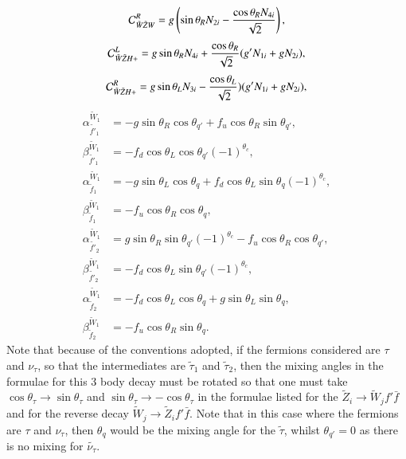 \documentclass[final,3p,times]{elsarticle}
\begin{document}
\begin{equation}
\mathcal{C}_{\tilde{W} \tilde{Z} W}^R = g\left(\sin\theta_R N_{2i} - {\cos\theta_R N_{4i} \over \sqrt{2}}\right),
\end{equation}
\begin{equation}
\mathcal{C}_{\tilde{W} \tilde{Z} H+}^L = g\sin\theta_R N_{4i} + {\cos\theta_R \over \sqrt{2}}(g' N_{1i} + g N_{2i}),
\end{equation}
\begin{equation}
\mathcal{C}_{\tilde{W} \tilde{Z} H+}^R = g\sin\theta_L N_{3i} - {\cos\theta_L \over \sqrt{2}})(g' N_{1i} + g N_{2i}),
\end{equation}
\begin{align}
\alpha_{\tilde{f'}_1}^{\tilde{W}_1} &= -g \sin\theta_R \cos\theta_{q'} + f_{u}\cos\theta_{R}\sin\theta_{q'}, \\
\beta_{\tilde{f'}_1}^{\tilde{W}_1} &= -f_{d}\cos\theta_L \cos\theta_{q'} (-1)^{\theta_c}, \\
\alpha_{\tilde{f}_1}^{\tilde{W}_1} &= -g\sin\theta_L \cos\theta_q + f_{d}\cos\theta_L \sin\theta_q(-1)^{\theta_c}, \\
\beta_{\tilde{f}_1}^{\tilde{W}_1} &= -f_{u}\cos\theta_R \cos\theta_q, \\
\alpha_{\tilde{f'}_2}^{\tilde{W}_1} &= g\sin\theta_R \sin\theta_{q'}(-1)^{\theta_c} - f_{u}\cos\theta_R \cos\theta_{q'}, \\
\beta_{\tilde{f'}_2}^{\tilde{W}_1} &= -f_{d}\cos\theta_L \sin\theta_{q'}(-1)^{\theta_c}, \\
\alpha_{\tilde{f}_2}^{\tilde{W}_1} &= -f_{d}\cos\theta_{L}\cos\theta_{q} + g\sin\theta_{L}\sin\theta_{q}, \\
\beta_{\tilde{f}_2}^{\tilde{W}_1} &= -f_{u}\cos\theta_R\sin\theta_{q}.
\end{align}
Note that because of the conventions adopted, if the fermions considered are $\tau$ and $\nu_{\tau}$, so that the intermediates are $\tilde{\tau}_1$ and $\tilde{\tau}_2$, then the mixing angles in the formulae for this 3 body	 decay must be rotated so that one must take $\cos\theta_{\tau} \rightarrow \sin\theta_{\tau}$ and $\sin\theta_{\tau} \rightarrow -\cos\theta_{\tau}$ in the formulae listed for the $\tilde{Z}_i \rightarrow \tilde{W}_j  f' \bar{f}$ and for the reverse decay $\tilde{W}_j \rightarrow \tilde{Z}_i  f' \bar{f}$. Note that in this case where the fermions are $\tau$ and $\nu_{\tau}$, then $\theta_q$ would be the mixing angle for the $\tilde{\tau}$, whilst $\theta_{q'} = 0$ as there is no mixing for $\tilde{\nu_{\tau}}$.
\end{document}
